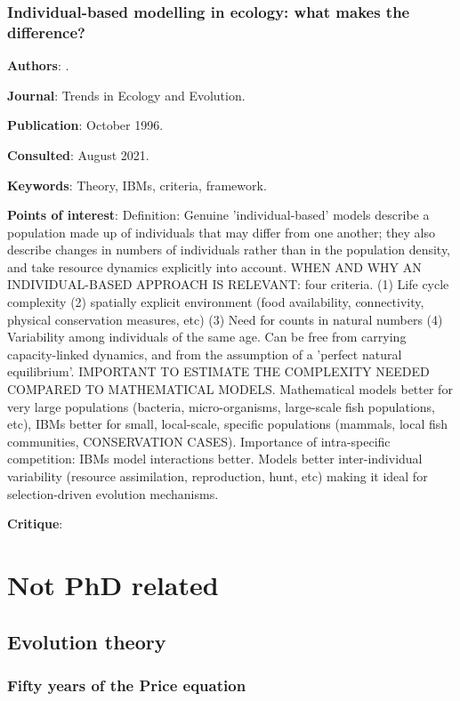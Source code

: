 \documentclass[12pt,a4paper]{article}
\begin{document}
\subsubsection*{Individual-based modelling in ecology: what makes the difference?}

\textbf{Authors}: \cite{uchmanski1996ibm}.

\textbf{Journal}: Trends in Ecology and Evolution.

\textbf{Publication}: October 1996.

\textbf{Consulted}: August 2021.

\textbf{Keywords}: Theory, IBMs, criteria, framework.

\textbf{Points of interest}: Definition: Genuine 'individual-based' models describe a population made up of individuals that may differ from one another; they also describe changes in numbers of individuals rather than in the population density, and take resource dynamics explicitly into account. WHEN AND WHY AN INDIVIDUAL-BASED APPROACH IS RELEVANT: four criteria. (1) Life cycle complexity (2) spatially explicit environment (food availability, connectivity, physical conservation measures, etc) (3) Need for counts in natural numbers (4) Variability among individuals of the same age. Can be free from carrying capacity-linked dynamics, and from the assumption of a 'perfect natural equilibrium'. IMPORTANT TO ESTIMATE THE COMPLEXITY NEEDED COMPARED TO MATHEMATICAL MODELS. Mathematical models better for very large populations (bacteria, micro-organisms, large-scale fish populations, etc), IBMs better for small, local-scale, specific populations (mammals, local fish communities, CONSERVATION CASES). Importance of intra-specific competition: IBMs model interactions better. Models better inter-individual variability (resource assimilation, reproduction, hunt, etc) making it ideal for selection-driven evolution mechanisms.

\textbf{Critique}:

\newpage

\section*{Not PhD related}

\subsection*{Evolution theory}

\subsubsection*{Fifty years of the Price equation}
\end{document}
